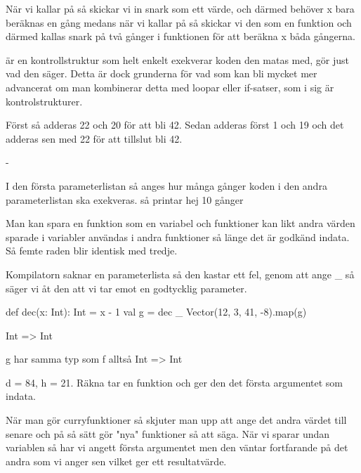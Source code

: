 \Subtask {}

\Subtask När vi kallar på  så skickar vi in snark som ett värde, och därmed behöver x bara beräknas en gång medans när vi kallar på  så skickar vi den som en funktion och därmed kallas snark på två gånger i funktionen för att beräkna x båda gångerna.


\Subtask {} är en kontrollstruktur som helt enkelt exekverar koden den matas med,  gör just vad den säger. Detta är dock grunderna för vad som kan bli mycket mer advancerat om man kombinerar detta med loopar eller if-satser, som i sig är kontrolstrukturer.

\Task 

Först så adderas 22 och 20 för att bli 42.
Sedan adderas först 1 och 19 och det adderas sen med 22 för att tillslut bli 42.

\Task

\Subtask -

\Subtask I den första parameterlistan så anges hur många gånger koden i den andra parameterlistan ska exekveras. så  printar hej 10 gånger

\Task

\Subtask Man kan spara en funktion som en variabel och funktioner kan likt andra värden sparade i variabler användas i andra funktioner så länge det är godkänd indata. Så femte raden blir identisk med tredje.

\Subtask Kompilatorn saknar en parameterlista så den kastar ett fel, genom att ange \_ så säger vi åt den att vi tar emot en godtycklig parameter.

\Subtask
\begin{REPLnonum}
def dec(x: Int): Int = x - 1
val g = dec _
Vector(12, 3, 41, -8).map(g)
\end{REPLnonum}

\Subtask Int => Int

g har samma typ som f alltså  Int => Int

\Subtask d = 84, h = 21. Räkna tar en funktion och ger den det första argumentet som indata.

\Task När man gör curryfunktioner så skjuter man upp att ange det andra värdet till senare och på så sätt gör "nya" funktioner så att säga. När vi sparar undan variablen  så har vi angett första argumentet men den väntar fortfarande på det andra som vi anger sen vilket ger ett resultatvärde.

